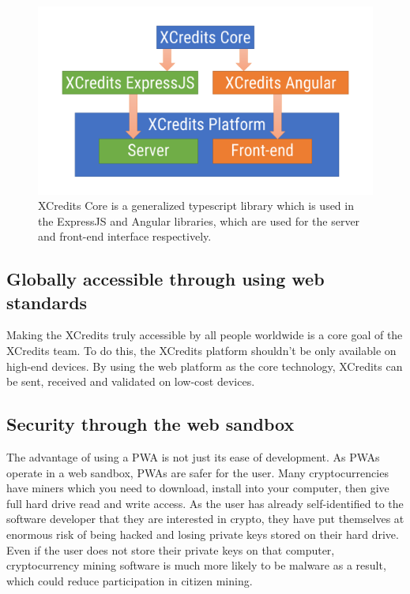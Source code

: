 \documentclass[a4paper,12pt]{article}
\begin{document}
\begin{figure}[!htb]
  \centering
  \includegraphics[page=1,width=.95\textwidth]{platform-structure} 
  \caption{XCredits Core is a generalized typescript library which is used in the ExpressJS and Angular libraries, which are used for the server and front-end interface respectively.}
  \label{fig:platform-structure}
\end{figure}
\FloatBarrier



\subsection{Globally accessible through using web standards}
Making the XCredits truly accessible by all people worldwide is a core goal of the XCredits team. To do this, the XCredits platform shouldn't be only available on high-end devices. By using the web platform as the core technology, XCredits can be sent, received and validated on low-cost devices. 


\subsection{Security through the web sandbox}
The advantage of using a PWA is not just its ease of development. As PWAs operate in a web sandbox, PWAs are safer for the user. Many cryptocurrencies have miners which you need to download, install into your computer, then give full hard drive read and write access. As the user has already self-identified to the software developer that they are interested in crypto, they have put themselves at enormous risk of being hacked and losing private keys stored on their hard drive. Even if the user does not store their private keys on that computer, cryptocurrency mining software is much more likely to be malware as a result, which could reduce participation in citizen mining.
\end{document}
